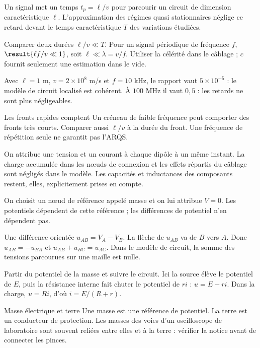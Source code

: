 Un signal met un temps $t_p=\ell/v$ pour parcourir un circuit de dimension caractéristique $\ell$. L’approximation des régimes quasi stationnaires néglige ce retard devant le temps caractéristique $T$ des variations étudiées.
\begin{loi}{Comparer deux durées}
$\ell/v\ll T$. Pour un signal périodique de fréquence $f$, $\result{\ell f/v\ll1}$, soit $\ell\ll\lambda=v/f$. Utiliser la célérité dans le câblage ; $c$ fournit seulement une estimation dans le vide.
\end{loi}
Avec $\ell=1$ m, $v=2\times10^8$ m/s et $f=10$ kHz, le rapport vaut $5\times10^{-5}$ : le modèle de circuit localisé est cohérent. À $100$ MHz il vaut $0{,}5$ : les retards ne sont plus négligeables.
\begin{piege}{Les fronts rapides comptent}
Un créneau de faible fréquence peut comporter des fronts très courts. Comparer aussi $\ell/v$ à la durée du front. Une fréquence de répétition seule ne garantit pas l’ARQS.
\end{piege}
On attribue une tension et un courant à chaque dipôle à un même instant. La charge accumulée dans les nœuds de connexion et les effets répartis du câblage sont négligés dans le modèle. Les capacités et inductances des composants restent, elles, explicitement prises en compte.


On choisit un nœud de référence appelé masse et on lui attribue $V=0$. Les potentiels dépendent de cette référence ; les différences de potentiel n’en dépendent pas.
\begin{loi}{Une différence orientée}
$u_{AB}=V_A-V_B$. La flèche de $u_{AB}$ va de $B$ vers $A$. Donc $u_{AB}=-u_{BA}$ et $u_{AB}+u_{BC}=u_{AC}$. Dans le modèle de circuit, la somme des tensions parcourues sur une maille est nulle.
\end{loi}
Partir du potentiel de la masse et suivre le circuit. Ici la source élève le potentiel de $E$, puis la résistance interne fait chuter le potentiel de $ri$ : $u=E-ri$. Dans la charge, $u=Ri$, d’où $i=E/(R+r)$.
\begin{piege}{Masse électrique et terre}
Une masse est une référence de potentiel. La terre est un conducteur de protection. Les masses des voies d’un oscilloscope de laboratoire sont souvent reliées entre elles et à la terre : vérifier la notice avant de connecter les pinces.
\end{piege}


